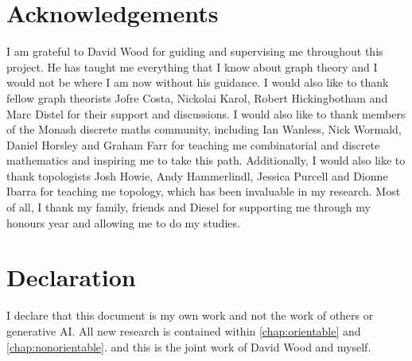 \section{Acknowledgements}
I am grateful to David Wood for guiding and supervising me throughout this project. He has taught me everything that I know about graph theory and I would not be where I am now without his guidance. I would also like to thank fellow graph theorists Jofre Costa, Nickolai Karol, Robert Hickingbotham and Marc Distel for their support and discussions. I would also like to thank members of the Monash discrete maths community, including Ian Wanless, Nick Wormald, Daniel Horsley and Graham Farr for teaching me combinatorial and discrete mathematics and inspiring me to take this path. Additionally, I would also like to thank topologists Josh Howie, Andy Hammerlindl, Jessica Purcell and Dionne Ibarra for teaching me topology, which has been invaluable in my research. Most of all, I thank my family, friends and Diesel for supporting me through my honours year and allowing me to do my studies.

\section{Declaration}

I declare that this document is my own work and not the work of others or generative AI. All new research is contained within \cref{chap:orientable} and \cref{chap:nonorientable}. and this is the joint work of David Wood and myself.
